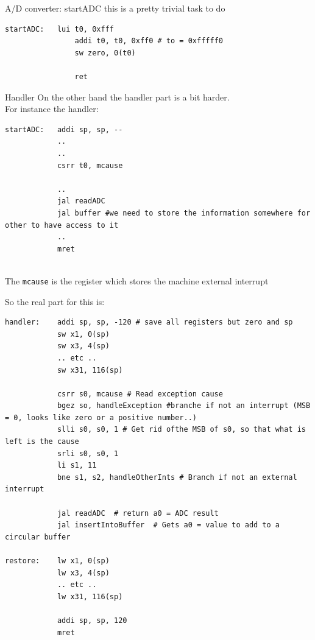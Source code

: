 \begin{parag}{A/D converter: startADC}
	this is a pretty trivial task to do
	\begin{lstlisting}[language={[RISC-V]Assembler}]
	startADC:	lui t0, 0xfff
				addi t0, t0, 0xff0 # to = 0xfffff0
				sw zero, 0(t0)

				ret
	\end{lstlisting}
\end{parag}
\begin{parag}{Handler}
    On the other hand the handler part is a bit harder.\\
	For instance the handler:\\
	
	\begin{lstlisting}[language={[RISC-V]Assembler}]
startADC:	addi sp, sp, --
			..
			..
			csrr t0, mcause

			..
			jal readADC
			jal buffer #we need to store the information somewhere for other to have access to it
			..
			mret
	
	\end{lstlisting}
	\begin{framedremark}
	The \texttt{mcause} is the register which stores the machine external interrupt
	\end{framedremark}
	So the real part for this is:
	\begin{lstlisting}[language={[RISC-V]Assembler}]
handler:	addi sp, sp, -120 # save all registers but zero and sp
			sw x1, 0(sp)
			sw x3, 4(sp)
			.. etc ..
			sw x31, 116(sp)

			csrr s0, mcause # Read exception cause
			bgez so, handleException #branche if not an interrupt (MSB = 0, looks like zero or a positive number..)
			slli s0, s0, 1 # Get rid ofthe MSB of s0, so that what is left is the cause
			srli s0, s0, 1 
			li s1, 11 
			bne s1, s2, handleOtherInts # Branch if not an external interrupt

			jal readADC  # return a0 = ADC result 
			jal insertIntoBuffer  # Gets a0 = value to add to a circular buffer

restore:	lw x1, 0(sp)
			lw x3, 4(sp)
			.. etc ..
			lw x31, 116(sp)

			addi sp, sp, 120
			mret
	\end{lstlisting}
	
\end{parag}
